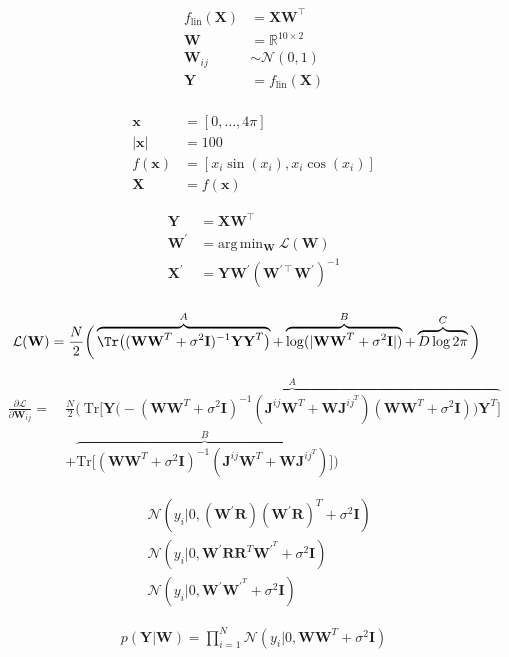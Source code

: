\begin{align*}
f_\text{lin}(\textbf{X}) &= \textbf{X}\textbf{W}^\intercal \\
\textbf{W} &= \mathbb{R}^{10\times2} \\
\textbf{W}_{ij} &\sim \mathcal{N}(0,1) \\
\textbf{Y} &= f_{\text{lin}}(\textbf{X}) \\
\end{align*}

\begin{align*}
\textbf{x} &= [0,\ldots,4\pi] \\
\lvert\textbf{x}\rvert &= 100 \\
f(\textbf{x}) &= [x_i \sin(x_i), x_i \cos(x_i)] \\
\textbf{X} &= f(\textbf{x})
\end{align*}

\begin{align*}
\textbf{Y} &= \textbf{X}\textbf{W}^\intercal \\
\textbf{W}^\prime &= \text{arg}\,\text{min}_\textbf{W}\ \mathcal{L}(\mathbf{W}) \\
\textbf{X}^\prime &= \textbf{Y}\textbf{W}^\prime(\textbf{W}^{\prime\intercal}\textbf{W}^\prime)^{-1} \\
\end{align*}

\begin{align*}
\mathcal{L}(\textbf{W}) &= \frac{N}{2}\bigg(\overbrace{\Tr\big((\textbf{W}\textbf{W}^T+\sigma^2\textbf{I})^{-1}\textbf{Y}\textbf{Y}^T\big)}^{A} + \overbrace{\log(\lvert\textbf{W}\textbf{W}^T+\sigma^2\textbf{I}\vert)}^{B} + \overbrace{D\log2\pi}^{C}\bigg)
\end{align*}

\begin{align*}
\frac{\partial\mathcal{L}}{\partial\textbf{W}_{ij}} =\ &\frac{N}{2}\Bigg(\ \overbrace{\text{Tr}\Big[\textbf{Y}\big(-(\textbf{W}\textbf{W}^T+\sigma^2\textbf{I})^{-1}(\textbf{J}^{ij}\textbf{W}^T + \textbf{W}\textbf{J}^{ij}^T)(\textbf{W}\textbf{W}^T+\sigma^2\textbf{I})\big)\textbf{Y}^T\Big]}^{A} \\ 
	&+ \overbrace{\text{Tr}\Big[(\textbf{W}\textbf{W}^T+\sigma^2\textbf{I})^{-1}(\textbf{J}^{ij}\textbf{W}^T + \textbf{W}\textbf{J}^{ij}^T)\Big]}^{B}\Bigg)
\end{align*}

\begin{align*}
&\mathcal{N}(y_i|0,(\textbf{W}^\prime\textbf{R})(\textbf{W}^\prime\textbf{R})^T + \sigma^2\textbf{I}) \\
&\mathcal{N}(y_i|0,\textbf{W}^\prime\textbf{R}\textbf{R}^T\textbf{W}^\prime^T + \sigma^2\textbf{I}) \\
&\mathcal{N}(y_i|0,\textbf{W}^\prime\textbf{W}^\prime^T + \sigma^2\textbf{I})
\end{align*}

\begin{align*}
p(\textbf{Y}|\textbf{W}) = \prod_{i=1}^N\mathcal{N}(y_i|0,\textbf{W}\textbf{W}^T + \sigma^2\textbf{I})
\end{align*}
